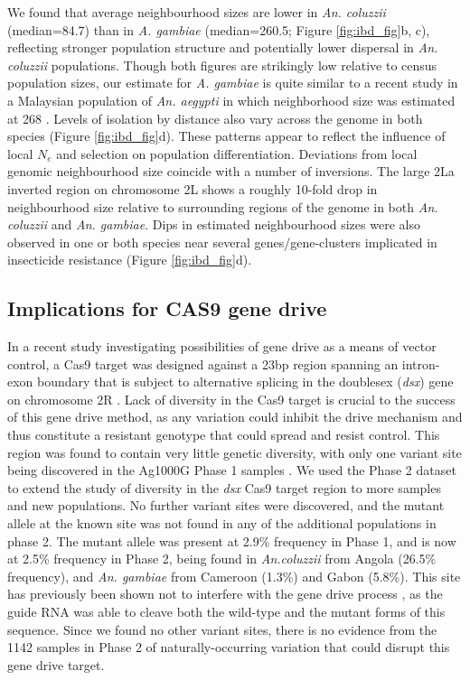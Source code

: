 \documentclass[a4paper,11pt,abstracton,hidelinks]{scrartcl}
\begin{document}
We found that average neighbourhood sizes are lower in \textit{An. coluzzii} (median=84.7) than in \textit{A. gambiae} (median=260.5; Figure \ref{fig:ibd_fig}b, c), reflecting stronger population structure and potentially lower dispersal in \textit{An. coluzzii} populations.
%
Though both figures are strikingly low relative to census population sizes, our estimate for \textit{A. gambiae} is quite similar to a recent study in a Malaysian population of \textit{An. aegypti} in which neighborhood size was estimated at 268 \cite{jasper2019genomic}.
%
Levels of isolation by distance also vary across the genome in both species (Figure \ref{fig:ibd_fig}d).
%
These patterns appear to reflect the influence of local $N_{e}$ and selection on population differentiation.
%
Deviations from local genomic neighbourhood size coincide with a number of inversions.
%
The large 2La inverted region on chromosome 2L shows a roughly 10-fold drop in neighbourhood size relative to surrounding regions of the genome in both \textit{An. coluzzii} and \textit{An. gambiae}.
%
Dips in estimated neighbourhood sizes were also observed in one or both species near several genes/gene-clusters implicated in insecticide resistance (Figure \ref{fig:ibd_fig}d). 



\subsection*{Implications for CAS9 gene drive}

In a recent study investigating possibilities of gene drive as a means of vector control, a Cas9 target was designed against a 23bp region spanning an intron-exon boundary that is subject to alternative splicing in the doublesex (\textit{dsx}) gene on chromosome 2R \cite{kyrou2018}.
%
Lack of diversity in the Cas9 target is crucial to the success of this gene drive method, as any variation could inhibit the drive mechanism and thus constitute a resistant genotype that could spread and resist control.
%
This region was found to contain very little genetic diversity, with only one variant site being discovered in the Ag1000G Phase 1 samples \cite{kyrou2018}.
%
We used the Phase 2 dataset to extend the study of diversity in the \textit{dsx} Cas9 target region to more samples and new populations. 
%
No further variant sites were discovered, and the mutant allele at the known site was not found in any of the additional populations in phase 2.
%
The mutant allele was present at 2.9\% frequency in Phase 1, and is now at 2.5\% frequency in Phase 2, being found in \textit{An.coluzzii} from Angola (26.5\% frequency), and \textit{An. gambiae} from Cameroon (1.3\%) and Gabon (5.8\%).
%
This site has previously been shown not to interfere with the gene drive process \cite{kyrou2018}, as the guide RNA was able to cleave both the wild-type and the mutant forms of this sequence. 
%
Since we found no other variant sites, there is no evidence from the 1142 samples in Phase 2 of naturally-occurring variation that could disrupt this gene drive target. 
\end{document}
